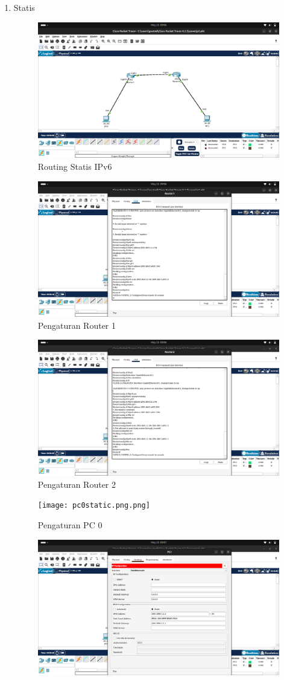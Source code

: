 \begin{enumerate}
    \item  Statis
    \begin{figure}[H]
        \centering
        \includegraphics[width=0.5\linewidth]{static.png}
        \caption{Routing Statis IPv6}
        \label{fig:gambar1}
    \end{figure}
    \begin{figure}[H]
        \centering
        \includegraphics[width=0.5\linewidth]{router1static.png}
        \caption{Pengaturan Router 1}
        \label{fig:gambar1}
    \end{figure}
    \begin{figure}[H]
        \centering
        \includegraphics[width=0.5\linewidth]{router2static.png}
        \caption{Pengaturan Router 2}
        \label{fig:gambar1}
    \end{figure}
    \begin{figure}[H]
        \centering
        \texttt{[image: pc0static.png.png]}
        \caption{Pengaturan PC 0}
        \label{fig:gambar1}
    \end{figure}
    \begin{figure}[H]
        \centering
        \includegraphics[width=0.5\linewidth]{pc1static.png}

\end{figure}
\end{enumerate}
